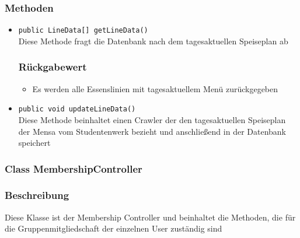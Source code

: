 \documentclass[a4paper]{scrreprt}
\begin{document}
\subsubsection*{Methoden}
\begin{addmargin}[25pt]{0pt}
\begin{itemize}

\item \texttt{public LineData[] getLineData()}\\
	Diese Methode fragt die Datenbank nach dem tagesaktuellen Speiseplan ab

	\subsubsection*{Rückgabewert}
	\begin{itemize}
	\item Es werden alle Essenslinien mit tagesaktuellem Menü zurückgegeben
	\end{itemize}
	
\item \texttt{public void updateLineData()}\\
	Diese Methode beinhaltet einen Crawler der den tagesaktuellen Speiseplan der Mensa vom Studentenwerk bezieht und anschließend in der Datenbank speichert
\end{itemize}
\end{addmargin}

\subsubsection{Class MembershipController}
\subsubsection*{Beschreibung}
Diese Klasse ist der Membership Controller und beinhaltet die Methoden, die für die Gruppenmitgliedschaft der einzelnen User zuständig sind
\end{document}
